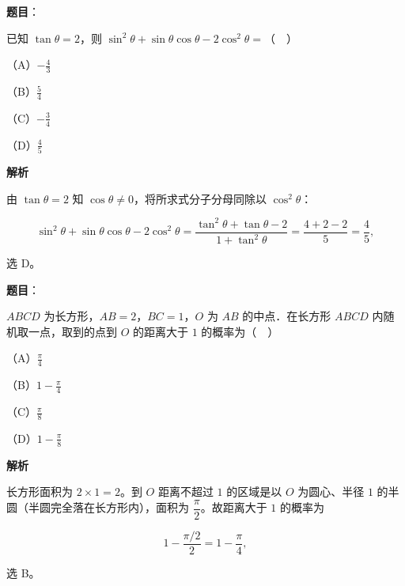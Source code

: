 \begin{answer}

\textbf{题目}：

已知 $\tan\theta=2$，则 $\sin^2\theta+\sin\theta\cos\theta-2\cos^2\theta=$（　）

（A）$-\frac43$

（B）$\frac54$

（C）$-\frac34$

（D）$\frac45$

\textbf{解析}

由 $\tan\theta=2$ 知 $\cos\theta\neq0$，将所求式分子分母同除以 $\cos^2\theta$：

\nopagebreak[4]
\[\sin^2\theta+\sin\theta\cos\theta-2\cos^2\theta
=\frac{\tan^2\theta+\tan\theta-2}{1+\tan^2\theta}
=\frac{4+2-2}{5}=\frac45,\]

选 D。


\end{answer}
\begin{answer}

\textbf{题目}：

$ABCD$ 为长方形，$AB=2$，$BC=1$，$O$ 为 $AB$ 的中点．在长方形 $ABCD$ 内随机取一点，取到的点到 $O$ 的距离大于 $1$ 的概率为（　）

（A）$\frac\pi4$

（B）$1-\frac\pi4$

（C）$\frac\pi8$

（D）$1-\frac\pi8$

\textbf{解析}

长方形面积为 $2\times1=2$。到 $O$ 距离不超过 $1$ 的区域是以 $O$ 为圆心、半径 $1$ 的半圆（半圆完全落在长方形内），面积为 $\dfrac{\pi}{2}$。故距离大于 $1$ 的概率为

\nopagebreak[4]
\[1-\frac{\pi/2}{2}=1-\frac\pi4,\]

选 B。


\end{answer}
